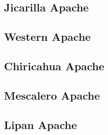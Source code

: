 \documentclass[12pt,letterpaper,oneside,article]{memoir}
\begin{document}
\subsection{Jicarilla Apache}\label{sec:jicarilla}

\subsection{Western Apache}\label{sec:westernapache}

\subsection{Chiricahua Apache}\label{sec:chiricahua}

\subsection{Mescalero Apache}\label{sec:mescalero}

\subsection{Lipan Apache}\label{sec:lipan}
\end{document}
